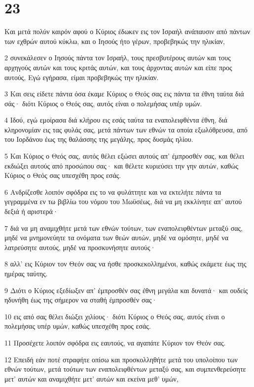 \chapter{23}

\par Και μετά πολύν καιρόν αφού ο Κύριος έδωκεν εις τον Ισραήλ ανάπαυσιν από πάντων των εχθρών αυτού κύκλω, και ο Ιησούς ήτο γέρων, προβεβηκώς την ηλικίαν,
\par 2 συνεκάλεσεν ο Ιησούς πάντα τον Ισραήλ, τους πρεσβυτέρους αυτών και τους αρχηγούς αυτών και τους κριτάς αυτών, και τους άρχοντας αυτών και είπε προς αυτούς, Εγώ εγήρασα, είμαι προβεβηκώς την ηλικίαν.
\par 3 Και σεις είδετε πάντα όσα έκαμε Κύριος ο Θεός σας εις πάντα τα έθνη ταύτα διά σάς· διότι Κύριος ο Θεός σας, αυτός είναι ο πολεμήσας υπέρ υμών.
\par 4 Ιδού, εγώ εμοίρασα διά κλήρου εις εσάς ταύτα τα εναπολειφθέντα έθνη, διά κληρονομίαν εις τας φυλάς σας, μετά πάντων των εθνών τα οποία εξωλόθρευσα, από του Ιορδάνου έως της θαλάσσης της μεγάλης, προς δυσμάς ηλίου.
\par 5 Και Κύριος ο Θεός σας, αυτός θέλει εξώσει αυτούς απ' έμπροσθέν σας, και θέλει εκδιώξει αυτούς από προσώπου σας· και θέλετε κυριεύσει την γην αυτών, καθώς Κύριος ο Θεός σας υπεσχέθη προς εσάς.
\par 6 Ανδρίζεσθε λοιπόν σφόδρα εις το να φυλάττητε και να εκτελήτε πάντα τα γεγραμμένα εν τω βιβλίω του νόμου του Μωϋσέως, διά να μη εκκλίνητε απ' αυτού δεξιά ή αριστερά·
\par 7 διά να μη αναμιχθήτε μετά των εθνών τούτων, των εναπολειφθέντων μεταξύ σας, μηδέ να μνημονεύητε τα ονόματα των θεών αυτών, μηδέ να ομόσητε, μηδέ να λατρεύσητε αυτούς, μηδέ να προσκυνήσητε αυτούς·
\par 8 αλλ' εις Κύριον τον Θεόν σας να ήσθε προσκεκολλημένοι, καθώς εκάμετε έως της ημέρας ταύτης.
\par 9 Διότι ο Κύριος εξεδίωξεν απ' έμπροσθέν σας έθνη μεγάλα και δυνατά· και ουδείς ηδυνήθη έως της σήμερον να σταθή έμπροσθέν σας·
\par 10 εις από σας θέλει διώξει χιλίους· διότι Κύριος ο Θεός σας, αυτός είναι ο πολεμήσας υπέρ υμών, καθώς υπεσχέθη προς εσάς.
\par 11 Προσέχετε λοιπόν σφόδρα εις εαυτούς, να αγαπάτε Κύριον τον Θεόν σας.
\par 12 Επειδή εάν ποτέ στραφήτε οπίσω και προσκολληθήτε μετά του υπολοίπου των εθνών τούτων, μετά τούτων των εναπολειφθέντων μεταξύ σας, και συμπενθερεύσητε μετ' αυτών και αναμιχθήτε μετ' αυτών και εκείνα μεθ' υμών,

